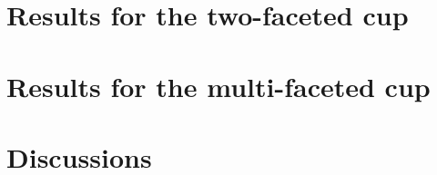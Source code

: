 %
\section{Results for the two-faceted cup}
\section{Results for the multi-faceted cup}
\section{Discussions}